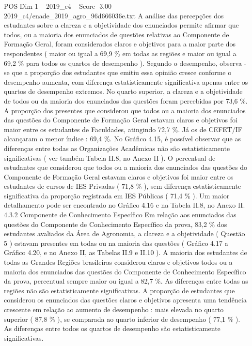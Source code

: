 \begin{textsample}{POS Dim 1 – 2019\_c4 – Score -3.00 – 2019\_c4/enade\_2019\_agro\_96d666036e.txt}
A análise das percepções dos estudantes sobre a clareza e a objetividade dos enunciados permite afirmar que todos, ou a maioria dos enunciados de questões relativas ao Componente de Formação Geral, foram considerados claros e objetivos para a maior parte dos respondentes ( maior ou igual a 69,9 \% em todas as regiões e maior ou igual a 69,2 \% para todos os quartos de desempenho ).
Segundo o desempenho, observa -se que a proporção dos estudantes que emitiu essa opinião cresce conforme o desempenho aumenta, com diferença estatisticamente significativa apenas entre os quartos de desempenho extremos.
No quarto superior, a clareza e a objetividade de todos ou da maioria dos enunciados das questões foram percebidas por 73,6 \%.
A proporção dos presentes que considerou que todos ou a maioria dos enunciados das questões do Componente de Formação Geral estavam claros e objetivos foi maior entre os estudantes de Faculdades, atingindo 72,7 \%.
Já os de CEFET/IF alcançaram o menor índice : 69,4 \%.
No Gráfico 4.15, é possível observar que as diferenças entre todas as Organizações Acadêmicas não são estatisticamente significativas ( ver também Tabela II.8, no Anexo II ).
O percentual de estudantes que considerou que todos ou a maioria dos enunciados das questões do Componente de Formação Geral estavam claros e objetivos foi maior entre os estudantes de cursos de IES Privadas ( 71,8 \% ), sem diferença estatisticamente significativa da proporção registrada em IES Públicas ( 71,4 \% ).
Um maior detalhamento pode ser encontrado no Gráfico 4.16 e na Tabela II.8, no Anexo II. 4.3.2 Componente de Conhecimento Específico Em relação aos enunciados das questões do Componente de Conhecimento Específico da prova, 83,2 \% dos estudantes avaliados da Área de Agronomia, a clareza e a objetividade ( Questão 5 ) estavam presentes em todas ou na maioria das questões ( Gráfico 4.17 a Gráfico 4.20, e no Anexo II, as Tabelas II.9 e II.10 ).
A maioria dos estudantes de todas as Grandes Regiões brasileiras considerou claros e objetivos todos ou a maioria dos enunciados das questões do Componente de Conhecimento Específico da prova, percentual sempre maior ou igual a 82,7 \%.
As diferenças entre todas as regiões não são estatisticamente significativas.
A proporção de estudantes que considerou os enunciados das questões claros e objetivos apresenta uma tendência crescente em relação ao aumento de desempenho : mais elevada no quarto superior ( 87,8 \% ), se comparada ao quarto inferior de desempenho ( 77,1 \% ).
As diferenças entre todos os quartos de desempenho são estatisticamente significativas.

\end{textsample}

